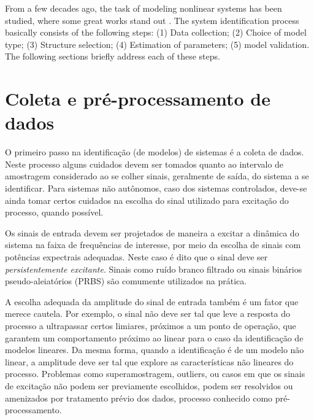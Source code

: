 From a few decades ago, the task of modeling nonlinear systems has been studied, where some great works stand out \citep{billings1980,leontaritis1985,leontaritis1985a,korenberg1988,billings1989,chen1990,chen1992,aguirre1995,aguirre2000,zhu2005}.
The system identification process basically consists of the following steps: (1) Data collection; (2) Choice of model type; (3) Structure selection; (4) Estimation of parameters; (5) model validation. The following sections briefly address each of these steps.

\section{Coleta e pré-processamento de dados}\label{sec:coleta}
O primeiro passo na identificação (de modelos) de sistemas é a coleta de dados. Neste processo alguns cuidados devem ser tomados quanto ao intervalo de amostragem considerado ao se colher sinais, geralmente de saída, do sistema a se identificar. Para sistemas não autônomos, caso dos sistemas controlados, deve-se ainda tomar certos cuidados na escolha do sinal utilizado para excitação do processo, quando possível. 

Os sinais de entrada devem ser projetados de maneira a excitar a dinâmica do sistema na faixa de frequências de interesse, por meio da escolha de sinais com potências expectrais adequadas. Neste caso é dito que o sinal deve ser \textit{persistentemente excitante}. Sinais como ruído branco filtrado ou sinais binários pseudo-aleiatórios (PRBS) são comumente  utilizados na prática.

A escolha adequada da amplitude do sinal de entrada também é um fator que merece cautela. Por exemplo, o sinal não deve ser tal que leve a resposta do processo a ultrapassar certos limiares,  próximos a um ponto de operação, que garantem um comportamento próximo ao linear para o caso da identificação de modelos lineares. Da mesma forma, quando a identificação é de um modelo não linear, a amplitude deve ser tal que explore as características não lineares do processo. 
Problemas como superamostragem, outliers, ou casos em que os sinais de excitação não podem ser previamente escolhidos, podem ser resolvidos ou amenizados por tratamento prévio dos dados, processo conhecido como pré-processamento. 

